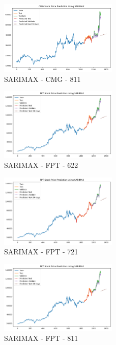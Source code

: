 \documentclass{ieeeojies}
\begin{document}
\begin{figure} [H]
    \centering
    \includegraphics[width=0.5\textwidth]{bibliography/Figure/SARIMAX_CMG_811_90.png}
    \caption{SARIMAX - CMG - 811}
    \label{fig:SARIMAX_CMG_811_90}
\end{figure}
\begin{figure} [H]
    \centering
    \includegraphics[width=0.5\textwidth]{bibliography/Figure/SARIMAX_FPT_622_90.png}
    \caption{SARIMAX - FPT - 622}
    \label{fig:SARIMAX_FPT_622_90}
\end{figure}
\begin{figure} [H]
    \centering
    \includegraphics[width=0.5\textwidth]{bibliography/Figure/SARIMAX_FPT_721_90.png}
    \caption{SARIMAX - FPT - 721}
    \label{fig:SARIMAX_FPT_721_90}
\end{figure}
\begin{figure} [H]
    \centering
    \includegraphics[width=0.5\textwidth]{bibliography/Figure/SARIMAX_FPT_811_90.png}
    \caption{SARIMAX - FPT - 811}
    \label{fig:SARIMAX_FPT_811_90}
\end{figure}
\end{document}
